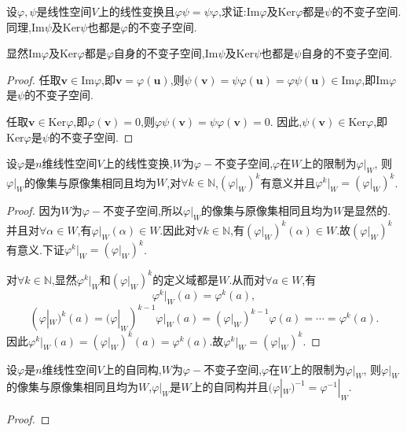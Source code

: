 \documentclass[lang=cn,newtx,10pt,scheme=chinese]{elegantbook}
\begin{document}
\begin{proposition}\label{proposition:乘法可交换的线性变换值域和核互为不变子空间}
设\(\varphi,\psi\)是线性空间\(V\)上的线性变换且\(\varphi\psi = \psi\varphi\),求证:\(\text{Im}\varphi\)及\(\text{Ker}\varphi\)都是\(\psi\)的不变子空间.同理,\(\text{Im}\psi\)及\(\text{Ker}\psi\)也都是\(\varphi\)的不变子空间.
\end{proposition}
\begin{note}
显然\(\text{Im}\varphi\)及\(\text{Ker}\varphi\)都是\(\varphi\)自身的不变子空间,\(\text{Im}\psi\)及\(\text{Ker}\psi\)也都是\(\psi\)自身的不变子空间.
\end{note}
\begin{proof}
任取\(\boldsymbol{v}\in\text{Im}\varphi\),即\(\boldsymbol{v}=\varphi(\boldsymbol{u})\),则\(\psi(\boldsymbol{v})=\psi\varphi(\boldsymbol{u})=\varphi\psi(\boldsymbol{u})\in\text{Im}\varphi\),即\(\text{Im}\varphi\)是\(\psi\)的不变子空间.

任取\(\boldsymbol{v}\in\text{Ker}\varphi\),即\(\varphi(\boldsymbol{v}) = 0\),则\(\varphi\psi(\boldsymbol{v})=\psi\varphi(\boldsymbol{v}) = 0\). 因此,\(\psi(\boldsymbol{v})\in\text{Ker}\varphi\),即\(\text{Ker}\varphi\)是\(\psi\)的不变子空间.
\end{proof}

\begin{proposition}\label{proposition:线性变换在其不变子空间下的限制}
设\(\varphi\)是\(n\)维线性空间\(V\)上的线性变换,\(W\)为\(\varphi -\)不变子空间,\(\varphi\)在\(W\)上的限制为\(\varphi|_W\),
则\(\varphi|_W\)的像集与原像集相同且均为\(W\),对\(\forall k\in \mathbb{N}\),\((\varphi|_W)^k\)有意义并且\(\varphi^k|_W = (\varphi|_W)^k\).    
\end{proposition}
\begin{proof}
因为\(W\)为\(\varphi -\)不变子空间,所以\(\varphi|_W\)的像集与原像集相同且均为\(W\)是显然的.
并且对\(\forall \alpha \in W\),有\(\varphi|_W(\alpha) \in W\).因此对\(\forall k \in \mathbb{N}\),有\((\varphi|_W)^k(\alpha) \in W\).故\((\varphi|_W)^k\)有意义.下证\(\varphi^k|_W = (\varphi|_W)^k\).

对\(\forall k\in \mathbb{N}\),显然\(\varphi^k|_W\)和\((\varphi|_W)^k\)的定义域都是\(W\).从而对\(\forall a\in W\),有
\[
\varphi^k|_W(a)=\varphi^k(a),
\]
\[
(\varphi|_W)^k(a)=(\varphi|_W)^{k - 1}\varphi|_W(a)=(\varphi|_W)^{k - 1}\varphi(a)=\cdots=\varphi^k(a).
\]
因此\(\varphi^k|_W(a)=(\varphi|_W)^k(a)=\varphi^k(a)\).故\(\varphi^k|_W = (\varphi|_W)^k\).
\end{proof}

\begin{proposition}\label{proposition:自同构在其不变子空间下的限制}
设\(\varphi\)是\(n\)维线性空间\(V\)上的自同构,\(W\)为\(\varphi -\)不变子空间,\(\varphi\)在\(W\)上的限制为\(\varphi|_W\),
则\(\varphi|_W\)的像集与原像集相同且均为\(W\),\(\varphi|_W\)是\(W\)上的自同构并且\((\varphi|_W)^{-1} = \varphi^{-1}|_W\).
\end{proposition}
\begin{proof}

\end{proof}
\end{document}

